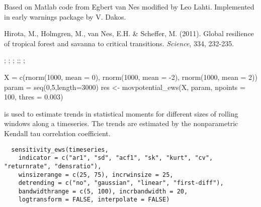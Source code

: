 \documentclass[a4paper]{book}
\begin{document}
%
\begin{Author}\relax
Based on Matlab code from Egbert van Nes modified by Leo
Lahti. Implemented in early warnings package by V. Dakos.
\end{Author}
%
\begin{References}\relax
Hirota, M., Holmgren, M., van Nes, E.H. \& Scheffer, M.
(2011). Global resilience of tropical forest and savanna
to critical transitions. \emph{Science}, 334, 232-235.
\end{References}
%
\begin{SeeAlso}\relax
{}; ;
;
;;
; 
\end{SeeAlso}
%
\begin{Examples}
\begin{ExampleCode}
X = c(rnorm(1000, mean = 0), rnorm(1000, mean = -2), rnorm(1000, mean = 2))
 param = seq(0,5,length=3000)
 res <- movpotential_ews(X, param, npoints = 100, thres = 0.003)
\end{ExampleCode}
\end{Examples}
%
\begin{Description}\relax
{} is used to estimate trends in
statistical moments for different sizes of rolling
windows along a timeseries. The trends are estimated by
the nonparametric Kendall tau correlation coefficient.
\end{Description}
%
\begin{Usage}
\begin{verbatim}
  sensitivity_ews(timeseries,
    indicator = c("ar1", "sd", "acf1", "sk", "kurt", "cv", "returnrate", "densratio"),
    winsizerange = c(25, 75), incrwinsize = 25,
    detrending = c("no", "gaussian", "linear", "first-diff"),
    bandwidthrange = c(5, 100), incrbandwidth = 20,
    logtransform = FALSE, interpolate = FALSE)
\end{verbatim}
\end{Usage}
%
\end{document}
